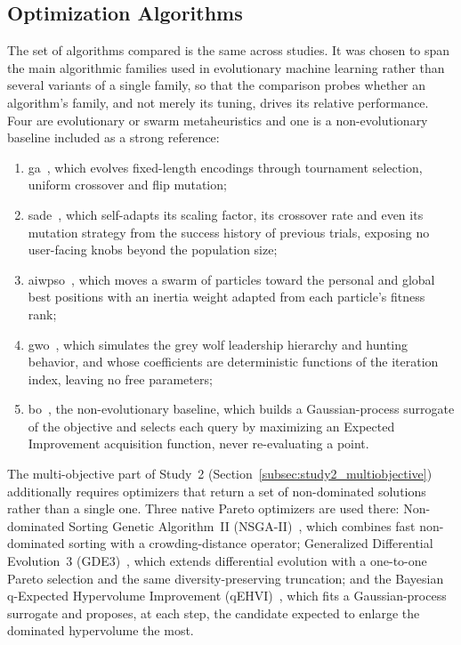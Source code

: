 \subsection{Optimization Algorithms}
\label{subsec:algorithms}

The set of algorithms compared is the same across studies. It was chosen to span the main algorithmic families used in evolutionary machine learning rather than several variants of a single family, so that the comparison probes whether an algorithm's family, and not merely its tuning, drives its relative performance. Four are evolutionary or swarm metaheuristics and one is a non-evolutionary baseline included as a strong reference:

\begin{enumerate}
    \item \acrfull{ga}~\cite{goldberg1989genetic}, which evolves fixed-length encodings through tournament selection, uniform crossover and flip mutation;
    \item \acrfull{sade}~\cite{qin2009sade}, which self-adapts its scaling factor, its crossover rate and even its mutation strategy from the success history of previous trials, exposing no user-facing knobs beyond the population size;
    \item \acrfull{aiwpso}~\cite{qin2006adaptive}, which moves a swarm of particles toward the personal and global best positions with an inertia weight adapted from each particle's fitness rank;
    \item \acrfull{gwo}~\cite{mirjalili2014gwo}, which simulates the grey wolf leadership hierarchy and hunting behavior, and whose coefficients are deterministic functions of the iteration index, leaving no free parameters;
    \item \acrfull{bo}~\cite{snoek2012bo}, the non-evolutionary baseline, which builds a Gaussian-process surrogate of the objective and selects each query by maximizing an Expected Improvement acquisition function, never re-evaluating a point.
\end{enumerate}

The multi-objective part of Study~2 (Section~\ref{subsec:study2_multiobjective}) additionally requires optimizers that return a set of non-dominated solutions rather than a single one. Three native Pareto optimizers are used there: Non-dominated Sorting Genetic Algorithm~II (NSGA-II)~\cite{deb2002nsga2}, which combines fast non-dominated sorting with a crowding-distance operator; Generalized Differential Evolution~3 (GDE3)~\cite{kukkonen2005gde3}, which extends differential evolution with a one-to-one Pareto selection and the same diversity-preserving truncation; and the Bayesian q-Expected Hypervolume Improvement (qEHVI)~\cite{daulton2020qehvi}, which fits a Gaussian-process surrogate and proposes, at each step, the candidate expected to enlarge the dominated hypervolume the most.


